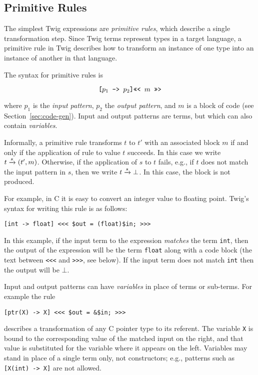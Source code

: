 
\subsection{Primitive Rules}
\label{sec:semantics:prims}

The simplest Twig expressions are \emph{primitive rules}, which
describe a single transformation step. Since Twig terms represent
types in a target language, a primitive rule in Twig describes how
to transform an instance of one type into an instance of another
in that language.

The syntax for primitive rules is

\[
\mbox{\texttt{[}} p_1 \mbox{\texttt{ -> }} p_2 \mbox{\texttt{]}} \mbox{\texttt{<<< }} m \mbox{\texttt{ >>>}}
\]

where $p_1$ is the \emph{input pattern}, $p_2$ the \emph{output
pattern}, and $m$ is a block of code (see
Section~\ref{sec:code-gen}). Input and output patterns are terms,
but which can also contain \emph{variables}.

Informally, a primitive rule transforms $t$ to $t'$ with an
associated block $m$ if and only if the application of rule to
value $t$ succeeds. In this case we write $t \xrightarrow{s} (t',m)$.
Otherwise, if the application of $s$ to $t$ fails, e.g., if $t$
does not match the input pattern in $s$, then we write $t \xrightarrow{s}
\bot$. In this case, the block is not produced.

For example, in C it is easy to convert an integer value to
floating point. Twig's syntax for writing this rule is as follows:

\begin{verbatim}
[int -> float] <<< $out = (float)$in; >>>
\end{verbatim}

In this example, if the input term to the expression
\emph{matches} the term \texttt{int}, then the output of the
expression will be the term \texttt{float} along with a code block
(the text between \texttt{<<<} and \texttt{>>>}, see below). If
the input term does not match \texttt{int} then the output will be
$\bot$.

Input and output patterns can have \emph{variables} in place of
terms or sub-terms. For example the rule

\begin{verbatim}
[ptr(X) -> X] <<< $out = &$in; >>>
\end{verbatim}

describes a transformation of any C pointer type to its referent.
The variable \texttt{X} is bound to the corresponding value of the
matched input on the right, and that value is substituted for the
variable where it appears on the left. Variables may stand in
place of a single term only, not constructors; e.g., patterns such
as \texttt{[X(int)~->~X]} are not allowed.

